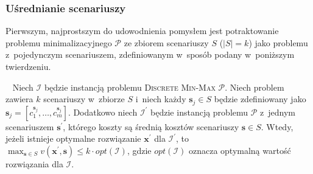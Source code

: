 \subsubsection{Uśrednianie scenariuszy}


Pierwszym, najprostszym do udowodnienia pomysłem jest potraktowanie problemu minimalizacyjnego $\mathcal{P}$ ze zbiorem scenariuszy $S$ ($\left| S \right| = k$) jako problemu z~pojedynczym scenariuszem, zdefiniowanym w~sposób podany w~poniższym twierdzeniu.

\begin{theorem}\label{th:minmaxavg}~\cite[$430$]{minmaxSurvey}
	Niech $\mathcal{I}$ będzie instancją problemu \textsc{Discrete Min-Max $\mathcal{P}$}.
	Niech problem zawiera $k$ scenariuszy w~zbiorze $S$ i~niech każdy $\textbf{s}_{j} \in S$ będzie zdefiniowany jako $\textbf{s}_{j} = \left[ c^{\textbf{s}_{j}}_{1}, \dots, c^{\textbf{s}_{j}}_{m} \right]$.
	Dodatkowo niech $\mathcal{I^{\prime}}$ będzie instancją problemu $\mathcal{P}$ z~jednym scenariuszem $\textbf{s}^{\prime}$, którego koszty są średnią kosztów scenariuszy $\textbf{s} \in S$.
	Wtedy, jeżeli istnieje optymalne rozwiązanie $\textbf{x}^{\prime}$ dla $\mathcal{I}^{\prime}$, to $\max_{\textbf{s} \in S} v \left( \textbf{x}^{\prime}, \textbf{s} \right) \leqslant k \cdot opt \left( \mathcal{I} \right)$, gdzie $opt \left( \mathcal{I} \right)$ oznacza optymalną wartość rozwiązania dla $\mathcal{I}$.
\end{theorem}

